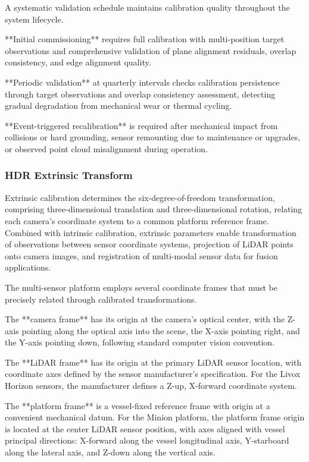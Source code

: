 A systematic validation schedule maintains calibration quality throughout the system lifecycle.

**Initial commissioning** requires full calibration with multi-position target observations and comprehensive validation of plane alignment residuals, overlap consistency, and edge alignment quality.

**Periodic validation** at quarterly intervals checks calibration persistence through target observations and overlap consistency assessment, detecting gradual degradation from mechanical wear or thermal cycling.

**Event-triggered recalibration** is required after mechanical impact from collisions or hard grounding, sensor remounting due to maintenance or upgrades, or observed point cloud misalignment during operation.

\subsubsection{HDR Extrinsic Transform} \label{HDR_extrinsic}

Extrinsic calibration determines the six-degree-of-freedom transformation, comprising three-dimensional translation and three-dimensional rotation, relating each camera's coordinate system to a common platform reference frame.
Combined with intrinsic calibration, extrinsic parameters enable transformation of observations between sensor coordinate systems, projection of LiDAR points onto camera images, and registration of multi-modal sensor data for fusion applications.


The multi-sensor platform employs several coordinate frames that must be precisely related through calibrated transformations.

The **camera frame** has its origin at the camera's optical center, with the Z-axis pointing along the optical axis into the scene, the X-axis pointing right, and the Y-axis pointing down, following standard computer vision convention.

The **LiDAR frame** has its origin at the primary LiDAR sensor location, with coordinate axes defined by the sensor manufacturer's specification.
For the Livox Horizon sensors, the manufacturer defines a Z-up, X-forward coordinate system.

The **platform frame** is a vessel-fixed reference frame with origin at a convenient mechanical datum.
For the Minion platform, the platform frame origin is located at the center LiDAR sensor position, with axes aligned with vessel principal directions: X-forward along the vessel longitudinal axis, Y-starboard along the lateral axis, and Z-down along the vertical axis.

